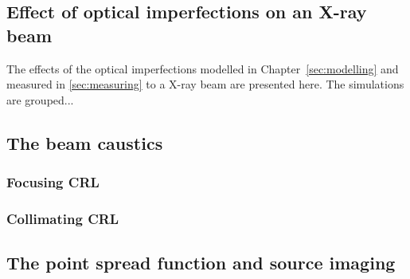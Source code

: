     \begin{refsection}
\chapter{Effect of optical imperfections on an X-ray beam}
\label{sec:effect_optical_imperfections}

The effects of the optical imperfections modelled in Chapter~\ref{sec:modelling} and measured in \ref{sec:measuring} to a X-ray beam are presented here. The simulations are grouped...

\section{The beam caustics}
\subsection{Focusing CRL}
\subsection{Collimating CRL}



\section{The point spread function and source imaging}


\end{refsection}
